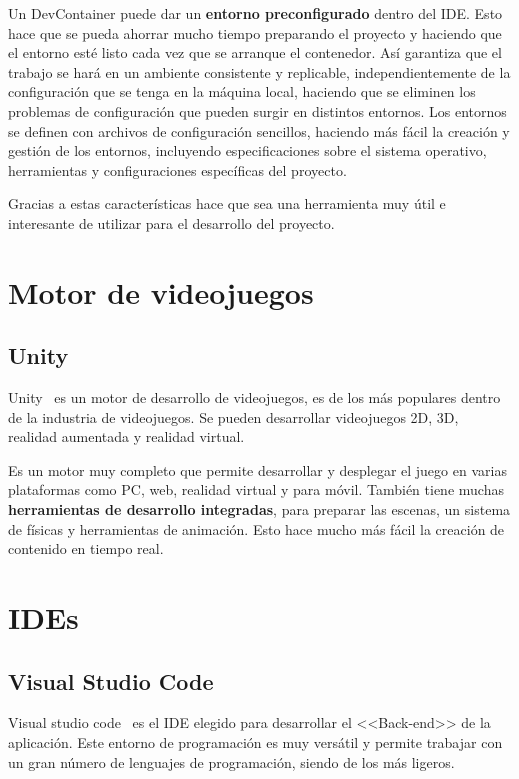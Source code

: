 Un DevContainer puede dar un \textbf{entorno preconfigurado} dentro del IDE. Esto hace que se pueda ahorrar mucho tiempo preparando el proyecto y haciendo que el entorno esté listo cada vez que se arranque el contenedor. Así garantiza que el trabajo se hará en un ambiente consistente y replicable, independientemente de la configuración que se tenga en la máquina local, haciendo que se eliminen los problemas de configuración que pueden surgir en distintos entornos.
Los entornos se definen con archivos de configuración sencillos, haciendo más fácil la creación y gestión de los entornos, incluyendo especificaciones sobre el sistema operativo, herramientas y configuraciones específicas del proyecto. 

Gracias a estas características hace que sea una herramienta muy útil e interesante de utilizar para el desarrollo del proyecto.

\section{Motor de videojuegos}

\subsection{Unity}
Unity~\cite{unity} es un motor de desarrollo de videojuegos, es de los más populares dentro de la industria de videojuegos. Se pueden desarrollar videojuegos 2D, 3D, realidad aumentada y realidad virtual. 

Es un motor muy completo que permite desarrollar y desplegar el juego en varias plataformas como PC, web, realidad virtual y para móvil. 
También tiene muchas \textbf{herramientas de desarrollo integradas}, para preparar las escenas, un sistema de físicas y herramientas de animación. Esto hace mucho más fácil la creación de contenido en tiempo real.


\section{IDEs}
\subsection{Visual Studio Code}
Visual studio code~\cite{vscode} es el IDE elegido para desarrollar el <<Back-end>> de la aplicación. Este entorno de programación es muy versátil y permite trabajar con un gran número de lenguajes de programación, siendo de los más ligeros. 

